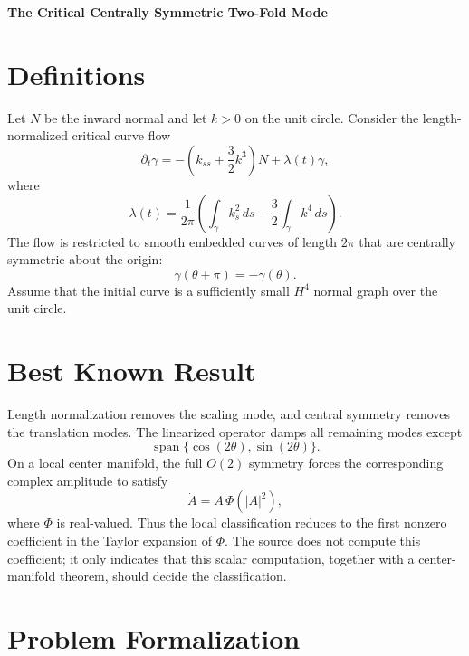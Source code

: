 \documentclass[10pt,a4paper]{article}
\theoremstyle{definition}
\begin{document}
\begin{center}
  {\Large\bfseries The Critical Centrally Symmetric Two-Fold Mode}
\end{center}

\section{Definitions}

Let $N$ be the inward normal and let $k>0$ on the unit circle. Consider
the length-normalized critical curve flow
\begin{equation}
  \partial_t\gamma
  =
  -\left(k_{ss}+\frac{3}{2}k^3\right)N
  +\lambda(t)\gamma,
\end{equation}
where
\begin{equation}
  \lambda(t)
  =
  \frac{1}{2\pi}
  \left(
    \int_\gamma k_s^2\,ds
    -
    \frac{3}{2}\int_\gamma k^4\,ds
  \right).
\end{equation}
The flow is restricted to smooth embedded curves of length $2\pi$ that are
centrally symmetric about the origin:
\begin{equation}
  \gamma(\theta+\pi)=-\gamma(\theta).
\end{equation}
Assume that the initial curve is a sufficiently small $H^4$ normal graph over
the unit circle.

\section{Best Known Result}

Length normalization removes the scaling mode, and central symmetry removes
the translation modes. The linearized operator damps all remaining modes
except
\begin{equation}
  \operatorname{span}\{\cos(2\theta),\sin(2\theta)\}.
\end{equation}
On a local center manifold, the full $O(2)$ symmetry forces the corresponding
complex amplitude to satisfy
\begin{equation}
  \dot A=A\,\Phi(|A|^2),
\end{equation}
where $\Phi$ is real-valued. Thus the local classification reduces to the
first nonzero coefficient in the Taylor expansion of $\Phi$. The source does
not compute this coefficient; it only indicates that this scalar computation,
together with a center-manifold theorem, should decide the classification.

\section{Problem Formalization}
\end{document}

